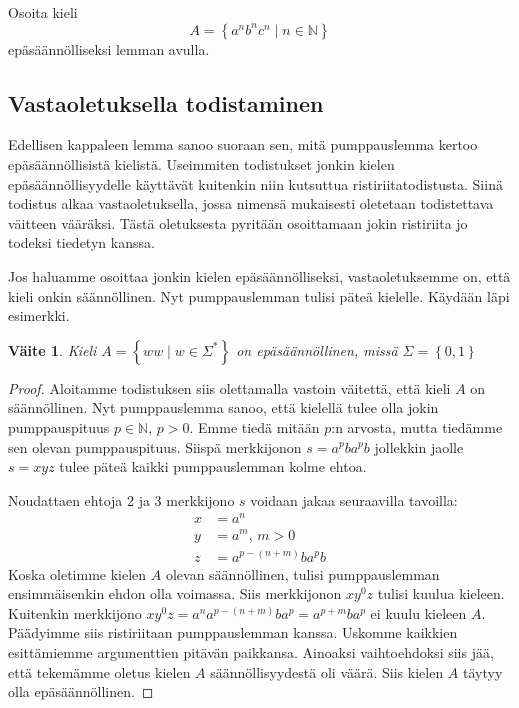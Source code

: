 \documentclass[a4paper,11pt]{article}
\newtheorem*{claim}{Väite}
\theoremstyle{definition}
\newcommand{\set}[1]{{\left\{ #1 \right\}}}
\newcommand{\Nat}{\mathbb{N}}
\begin{document}
\begin{exercise}
  Osoita kieli
  \begin{equation*}
      A = \set{a^nb^nc^n \mid n \in \Nat}
  \end{equation*}
  epäsäännölliseksi lemman avulla.
\end{exercise}

\subsection*{Vastaoletuksella todistaminen}

Edellisen kappaleen lemma sanoo suoraan sen, mitä pumppauslemma kertoo
epäsäännöllisistä kielistä. Useimmiten todistukset jonkin kielen
epäsäännöllisyydelle käyttävät kuitenkin niin kutsuttua ristiriitatodistusta.
Siinä todistus alkaa vastaoletuksella, jossa nimensä mukaisesti oletetaan
todistettava väitteen vääräksi. Tästä oletuksesta pyritään osoittamaan
jokin ristiriita jo todeksi tiedetyn kanssa.

Jos haluamme osoittaa jonkin kielen epäsäännölliseksi, vastaoletuksemme on,
että kieli onkin säännöllinen. Nyt pumppauslemman tulisi päteä kielelle.
Käydään läpi esimerkki.

\begin{claim}
    Kieli $A = \set{ww \mid w \in \Sigma^*}$ on epäsäännöllinen, missä $\Sigma
    = \set{0,1}$
\end{claim}
\begin{proof}
    Aloitamme todistuksen siis olettamalla vastoin väi\-tet\-tä, että kieli $A$ on
    säännöllinen. Nyt pumppauslemma sanoo, että kielellä tulee olla jokin
    pumppauspituus $p \in \Nat$, $p > 0$. Emme tiedä mitään $p$:n arvosta,
    mutta tiedämme sen olevan pumppauspituus. Siispä merkkijonon $s =
    a^pba^pb$ jollekkin jaolle $s = xyz$ tulee päteä kaikki pumppauslemman
    kolme ehtoa.

    Noudattaen ehtoja 2 ja 3 merkkijono $s$ voidaan jakaa seuraavilla tavoilla:
    \begin{align*}
        x & = a^n \\
        y & = a^m \text{, } m > 0 \\
        z & = a^{p-(n+m)}ba^pb
    \end{align*}
    Koska oletimme kielen $A$ olevan säännöllinen, tulisi pumppauslemman
    ensimmäisenkin ehdon olla voimassa. Siis merkkijonon $xy^0z$ tulisi kuulua
    kieleen. Kuitenkin merkkijono $xy^0z = a^na^{p-(n+m)}ba^p = a^{p+m}ba^p$ ei
    kuulu kieleen $A$. Päädyimme siis ristiriitaan pumppauslemman kanssa.
    Uskomme kaikkien esittämiemme argumenttien pitävän paikkansa.  Ainoaksi
    vaihtoehdoksi siis jää, että tekemämme oletus kielen $A$
    sään\-nöl\-li\-syy\-des\-tä oli väärä. Siis kielen $A$ täytyy olla
    epäsäännöllinen.
\end{proof}
\end{document}

